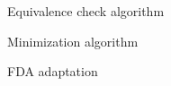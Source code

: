 \begin{figure}[H]
	\begin{center}
		 
		\caption{Equivalence check algorithm}
		\label{fig:equivalence-check}
	\end{center}
\end{figure}

\begin{figure}[H]
	\begin{center}
		 
		\caption{Minimization algorithm}
		\label{fig:minimization}
	\end{center}
\end{figure}


\begin{figure}[H]
	\begin{center}
		 
		\caption{FDA adaptation}
		\label{fig:fda-adaptation}
	\end{center}
\end{figure}